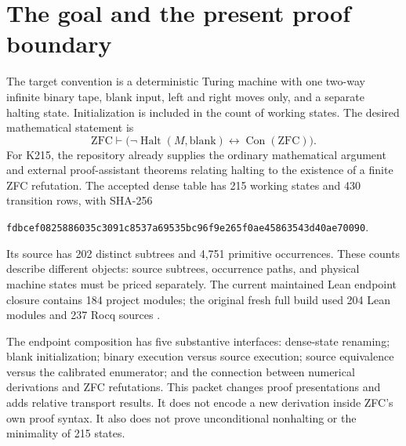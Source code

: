 \documentclass[11pt,letterpaper]{article}
\newcommand{\Con}{\operatorname{Con}}
\newcommand{\Halt}{\operatorname{Halt}}
\begin{document}
\section{The goal and the present proof boundary}
The target convention is a deterministic Turing machine with one two-way infinite binary tape, blank input, left and right moves only, and a separate halting state. Initialization is included in the count of working states. The desired mathematical statement is
\[
 \mathrm{ZFC}\vdash\bigl(\neg\Halt(M,\mathrm{blank})\leftrightarrow\Con(\mathrm{ZFC})\bigr).
\]
For K215, the repository already supplies the ordinary mathematical argument and external proof-assistant theorems relating halting to the existence of a finite ZFC refutation. The accepted dense table has 215 working states and 430 transition rows, with SHA-256
\begin{center}\small\texttt{fdbcef0825886035c3091c8537a69535bc96f9e265f0ae45863543d40ae70090}.\end{center}
Its source has 202 distinct subtrees and 4,751 primitive occurrences. These counts describe different objects: source subtrees, occurrence paths, and physical machine states must be priced separately. The current maintained Lean endpoint closure contains 184 project modules; the original fresh full build used 204 Lean modules and 237 Rocq sources \cite{primary,verification,phase5}.

The endpoint composition has five substantive interfaces: dense-state renaming; blank initialization; binary execution versus source execution; source equivalence versus the calibrated enumerator; and the connection between numerical derivations and ZFC refutations. This packet changes proof presentations and adds relative transport results. It does not encode a new derivation inside ZFC's own proof syntax. It also does not prove unconditional nonhalting or the minimality of 215 states.
\end{document}

